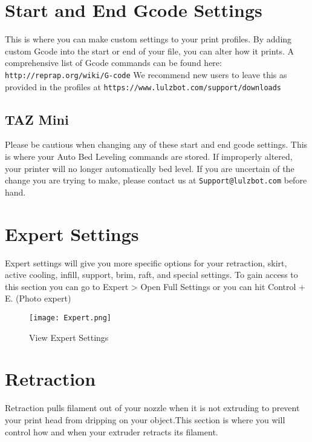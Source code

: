 \section{Start and End Gcode Settings}

This is where you can make custom settings to your print profiles. By adding custom Gcode into the start or end of your file, you can alter how it prints. A comprehensive list of Gcode commands can be found here: \texttt{http://reprap.org/wiki/G-code} We recommend new users to leave this as provided in the profiles at \texttt{https://www.lulzbot.com/support/downloads}

\subsection{TAZ Mini}
Please be cautious when changing any of these start and end gcode settings. This is where your Auto Bed Leveling commands are stored. If improperly altered, your printer will no longer         automatically bed level. If you are uncertain of the change you are trying to make, please contact us at \texttt{Support@lulzbot.com} before hand.

\section{Expert Settings}

Expert settings will give you more specific options for your retraction, skirt, active cooling, infill, support, brim, raft, and special settings. To gain access to this section you can go to Expert > Open Full Settings or you can hit Control + E. (Photo expert)
\begin{figure}[hbt]
\centering
\texttt{[image: Expert.png]}
\caption{View Expert Settings}
\label{fig:Expert Settings}
\end{figure}

\section{Retraction}

Retraction pulls filament out of your nozzle when it is not extruding to prevent your print head from dripping on your object.This section is where you will control how and when your extruder retracts its filament.

